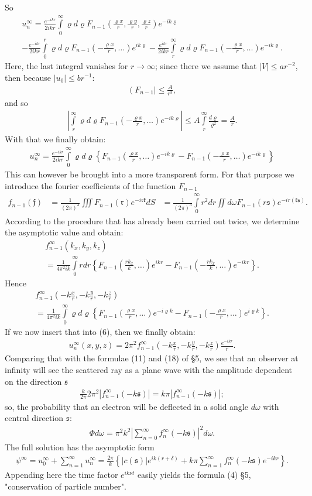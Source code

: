 \documentclass[a4paper,11pt]{article}
\newcommand{\?}[2]{#1\footnote{\textsc{Translator note}: #2}}
\newcommand{\nequ}[2]{\begin{align*}\tag{#1}#2\end{align*}}
\newcommand{\uequ}[1]{\begin{align*}#1\end{align*}}
\renewcommand{\exp}[1]{e^{#1}}
\begin{document}
So
\uequ{
u_n^\infty = \frac{\exp{-ikr}}{2ikr}\int\limits_0^\infty\varrho d\varrho
F_{n-1}\left(\frac{\varrho x}{r}, \frac{\varrho y}{r}, \frac{\varrho z}{r}\right)
\exp{-ik\varrho}\\
- \frac{\exp{-ikr}}{2ikr}\int\limits_0^r \varrho d\varrho
F_{n-1}\left(-\frac{\varrho x}{r}, \dots \right)\exp{ik\varrho}
- \frac{\exp{ikr}}{2ikr}\int\limits_r^\infty \varrho d\varrho
F_{n-1}\left(-\frac{\varrho x}{r}, \dots\right)\exp{-ik\varrho}.
}
Here, the last integral vanishes for $r\to\infty$; since there we assume that $|V|\leq ar^{-2}$, then because $|u_0|\leq br^{-1}$:
\uequ{
\left(F_{n-1}\right| \leq \frac{A}{r^3},
}
and so
\uequ{
\left|\int\limits_r^\infty \varrho d\varrho F_{n-1}\left(-\frac{\varrho x}{r},\dots\right)\exp{-ik\varrho}\right|
\leq A\int\limits_r^\infty\frac{d\varrho}{\varrho^2} = \frac{A}{r}.
}
With that we finally obtain:
\nequ{6}{
u_n^\infty = \frac{\exp{-ikr}}{2ikr}\int\limits_0^\infty \varrho d\varrho
\left\{F_{n-1}\left(\frac{\varrho x}{r}, \dots\right)\exp{-ik\varrho}
- F_{n-1}\left(-\frac{\varrho x}{r}, \dots\right)\exp{-ik\varrho}\right\}
}
This can however be brought into a more transparent form. For that purpose we introduce the fourier coefficients of the function $F_{n-1}$
\nequ{7}{
f_{n-1}(\mathfrak{f}) &= \frac{1}{(2\pi)^3}\iiint F_{n-1}(\mathfrak{r})
\exp{-i\mathfrak{rk}}dS
&= \frac{1}{(2\pi)^3}\int\limits_0^\infty r^2 dr \iint d\omega F_{n-1}
(r\mathfrak{s})\exp{-ir(\mathfrak{ks})}.  
}
According to the procedure that has already been carried out twice, we determine the asymptotic value and obtain:
\uequ{
f_{n-1}^\infty\left(k_x,k_y,k_z\right)\\
= \frac{1}{4\pi^2 ik}\int\limits_0^\infty r dr \left\{
F_{n-1}\left(\frac{rk_x}{k},\dots\right)\exp{ikr} - 
F_{n-1}\left(-\frac{rk_x}{k}, \dots\right)\exp{-ikr}
\right\}. 
}
Hence
\nequ{8}{
f_{n-1}^\infty\left(-k\frac{x}{r}, -k\frac{y}{r}, -k\frac{z}{r}\right)\\
 = \frac{1}{4\pi^2 ik}\int\limits_0^\infty \varrho d\varrho \left\{
F_{n-1}\left(\frac{\varrho x}{r}, \dots \right)\exp{-i\varrho k} -
F_{n-1}\left(-\frac{\varrho x}{r}, \dots \right)\exp{i\varrho k}
 \right\}.
}
If we now insert that into (6), then we finally obtain:
\nequ{9}{
u_n^\infty (x, y, z) = 2\pi^2 f_{n-1}^\infty\left(-k\frac{x}{r}, -k\frac{y}{r}, -k\frac{z}{r}\right)\frac{\exp{-ikr}}{r}.
}
Comparing that with the formulae (11) and (18) of \S5, we see that an observer at infinity will see the scattered ray as a plane wave with the amplitude dependent on the direction $\mathfrak{s}$
\uequ{
\frac{k}{2\pi}2\pi^2 \left|f_{n-1}^\infty\left(-k\mathfrak{s}\right)\right|
 = k\pi\left|f_{n-1}^\infty\left(-k\mathfrak{s}\right)\right|;
}
so, the probability that an electron will be deflected in a solid angle $d\omega$ with central direction $\mathfrak{s}$:
\nequ{10}{
\Phi d\omega = \pi^2 k^2\left|\sum\limits_{n=0}^\infty f_n^\infty(-k\mathfrak{s})\right|^2 d\omega.
}
The full solution has the asymptotic form
\uequ{
\psi^\infty = u_0^\infty + \sum\limits_{n=1}^\infty u_n^\infty = 
\frac{2\pi}{k}\left\{\left|c(\mathfrak{s})\right|\exp{ik(r+\delta)}
 + k\pi\sum\limits_{n=1}^\infty f_n^\infty(-k\mathfrak{s})\exp{-ikr}\right\}.
}
Appending here the time factor $\exp{ik\nu t}$ easily yields the formula (4) \S5, "conservation of particle number".
\end{document}
